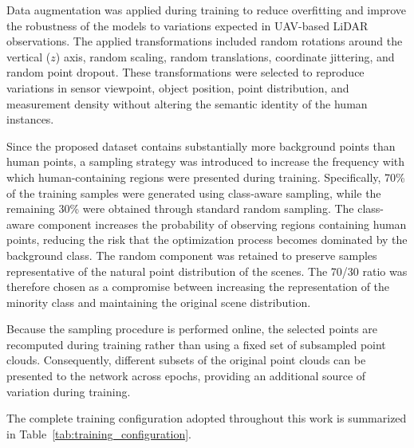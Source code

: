 Data augmentation was applied during training to reduce overfitting and improve the robustness of the models to variations expected in UAV-based LiDAR observations. The applied transformations included random rotations around the vertical ($z$) axis, random scaling, random translations, coordinate jittering, and random point dropout. These transformations were selected to reproduce variations in sensor viewpoint, object position, point distribution, and measurement density without altering the semantic identity of the human instances.

Since the proposed dataset contains substantially more background points than human points, a sampling strategy was introduced to increase the frequency with which human-containing regions were presented during training. Specifically, 70\% of the training samples were generated using class-aware sampling, while the remaining 30\% were obtained through standard random sampling. The class-aware component increases the probability of observing regions containing human points, reducing the risk that the optimization process becomes dominated by the background class. The random component was retained to preserve samples representative of the natural point distribution of the scenes. The 70/30 ratio was therefore chosen as a compromise between increasing the representation of the minority class and maintaining the original scene distribution.

Because the sampling procedure is performed online, the selected points are recomputed during training rather than using a fixed set of subsampled point clouds. Consequently, different subsets of the original point clouds can be presented to the network across epochs, providing an additional source of variation during training.

The complete training configuration adopted throughout this work is summarized in Table~\ref{tab:training_configuration}.

